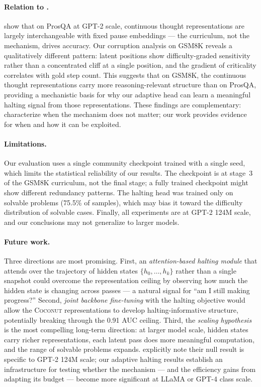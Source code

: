 \documentclass{article}
\begin{document}
\paragraph{Relation to \citet{martin2025curriculum}.}

\citeauthor{martin2025curriculum} show that on ProsQA at GPT-2 scale, continuous thought representations are largely interchangeable with fixed pause embeddings --- the curriculum, not the mechanism, drives accuracy. Our corruption analysis on GSM8K reveals a qualitatively different pattern: latent positions show difficulty-graded sensitivity rather than a concentrated cliff at a single position, and the gradient of criticality correlates with gold step count. This suggests that on GSM8K, the continuous thought representations carry more reasoning-relevant structure than on ProsQA, providing a mechanistic basis for why our adaptive head can learn a meaningful halting signal from those representations. These findings are complementary: \citeauthor{martin2025curriculum} characterize when the mechanism does not matter; our work provides evidence for when and how it can be exploited.

\paragraph{Limitations.}

Our evaluation uses a single community checkpoint trained with a single seed, which limits the statistical reliability of our results. The checkpoint is at stage~3 of the GSM8K curriculum, not the final stage; a fully trained checkpoint might show different redundancy patterns. The halting head was trained only on solvable problems (75.5\% of samples), which may bias it toward the difficulty distribution of solvable cases. Finally, all experiments are at GPT-2 124M scale, and our conclusions may not generalize to larger models.

\paragraph{Future work.}

Three directions are most promising. First, an \textit{attention-based halting module} that attends over the trajectory of hidden states $\{h_0, \ldots, h_k\}$ rather than a single snapshot could overcome the representation ceiling by observing how much the hidden state is changing across passes --- a natural signal for ``am I still making progress?'' Second, \textit{joint backbone fine-tuning} with the halting objective would allow the \textsc{Coconut} representations to develop halting-informative structure, potentially breaking through the 0.91 AUC ceiling. Third, the \textit{scaling hypothesis} is the most compelling long-term direction: at larger model scale, hidden states carry richer representations, each latent pass does more meaningful computation, and the range of solvable problems expands. \citet{martin2025curriculum} explicitly note their null result is specific to GPT-2 124M scale; our adaptive halting results establish an infrastructure for testing whether the mechanism --- and the efficiency gains from adapting its budget --- become more significant at LLaMA or GPT-4 class scale.


\end{document}
